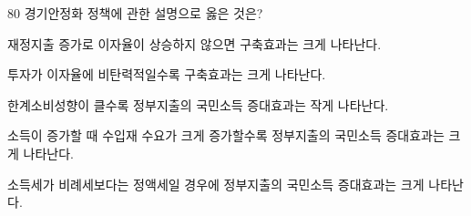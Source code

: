 \begin{question}{80}
경기안정화 정책에 관한 설명으로 옳은 것은?
\begin{choices}
  \item 재정지출 증가로 이자율이 상승하지 않으면 구축효과는 크게 나타난다.
  \item 투자가 이자율에 비탄력적일수록 구축효과는 크게 나타난다.
  \item 한계소비성향이 클수록 정부지출의 국민소득 증대효과는 작게 나타난다.
  \item 소득이 증가할 때 수입재 수요가 크게 증가할수록 정부지출의 국민소득 증대효과는 크게 나타난다.
  \item 소득세가 비례세보다는 정액세일 경우에 정부지출의 국민소득 증대효과는 크게 나타난다.
\end{choices}
\end{question}
